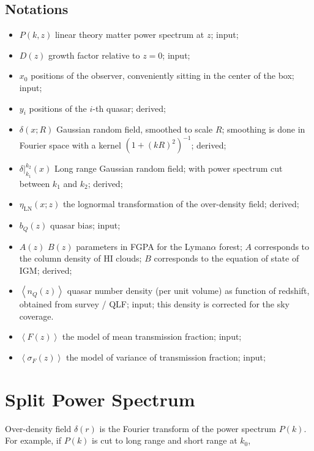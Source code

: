 \documentclass{paper}
\begin{document}
\subsection{Notations}
\begin{itemize}
    \item $P(k, z)$
        linear theory matter power spectrum at $z$; input;
    \item $D(z)$
        growth factor relative to $z=0$; input;

    \item $x_0$ positions of the observer, conveniently
        sitting in the center of the box; input;

    \item $y_i$ positions of the $i$-th quasar; derived;

    \item $\delta(x; R)$ 
        Gaussian random field, smoothed to scale $R$;
        smoothing is done in Fourier space with a kernel 
        $(1 + (kR)^2)^{-1}$; derived;
    \item $\delta|_{k_1}^{k_2}(x)$ 
        Long range Gaussian random field; with power
        spectrum cut between $k_1$ and $k_2$; derived;

    \item $\eta_\mathrm{LN}(x; z)$ the lognormal
        transformation of the over-density field; derived;

    \item $b_Q(z)$ quasar bias; input;

    \item $A(z)$ $B(z)$ parameters in FGPA for 
        the Lyman$\alpha$ forest; $A$ corresponds to the
        column density of HI clouds; $B$ corresponds to the 
        equation of state of IGM; derived;

    \item $\left<n_Q(z)\right>$ quasar number density (per
        unit volume) as
        function of redshift, obtained from survey / QLF;
        input; this density is corrected for the sky coverage.
    \item $\left<F(z)\right>$ the model of mean transmission
        fraction; input;
    \item $\left<\sigma_F(z)\right>$ the model of variance of
        transmission fraction; input;

\end{itemize}

\section{Split Power Spectrum}
    Over-density field $\delta(r)$ is the Fourier transform of
    the power spectrum $P(k)$. For example, if $P(k)$ is cut to 
    long range and short range at $k_0$, 
\end{document}
